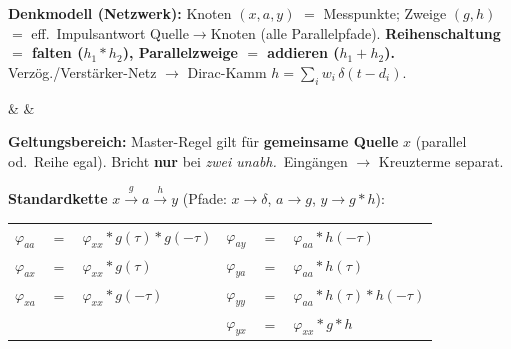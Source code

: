 \noindent\footnotesize
\textbf{Denkmodell (Netzwerk):} Knoten $(x,a,y)$ $=$ Messpunkte; Zweige $(g,h)$ $=$
eff.\ Impulsantwort Quelle$\to$Knoten (alle Parallelpfade).\;
\textbf{Reihenschaltung $=$ falten ($h_1{*}h_2$), Parallelzweige $=$ addieren ($h_1{+}h_2$).}\;
Verzög./Verstärker-Netz $\to$ Dirac-Kamm $h=\sum_i w_i\,\delta(t{-}d_i)$.\par
\vspace{0.15em}
\begin{formelreihe}
   &
   &
   \\
\end{formelreihe}
\par\vspace{0.15em}\noindent\footnotesize
\textbf{Geltungsbereich:} Master-Regel gilt für \textbf{gemeinsame Quelle} $x$
(parallel od.\ Reihe egal).\;
Bricht \textbf{nur} bei \emph{zwei unabh.}\ Eingängen $\to$ Kreuzterme separat.\par
\vspace{0.2em}
\noindent\scriptsize\textbf{Standardkette} $x\xrightarrow{\;g\;}a\xrightarrow{\;h\;}y$
\;(Pfade: $x{\to}\delta$, $a{\to}g$, $y{\to}g{*}h$):
\setlength{\tabcolsep}{5pt}\renewcommand{\arraystretch}{1.2}%
\begin{tabular}{@{}l@{\;}c@{\;}l|l@{\;}c@{\;}l@{}}
  $\varphi_{aa}$ & $=$ & $\varphi_{xx}*g(\tau)*g(-\tau)$ &
  $\varphi_{ay}$ & $=$ & $\varphi_{aa}*h(-\tau)$ \\
  $\varphi_{ax}$ & $=$ & $\varphi_{xx}*g(\tau)$ &
  $\varphi_{ya}$ & $=$ & $\varphi_{aa}*h(\tau)$ \\
  $\varphi_{xa}$ & $=$ & $\varphi_{xx}*g(-\tau)$ &
  $\varphi_{yy}$ & $=$ & $\varphi_{aa}*h(\tau)*h(-\tau)$ \\
  \multicolumn{3}{l|}{} &
  $\varphi_{yx}$ & $=$ & $\varphi_{xx}*g*h$ \\
\end{tabular}\par
\bereichende

